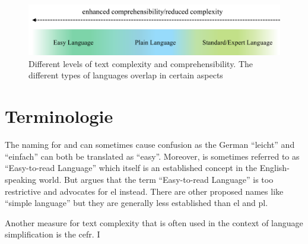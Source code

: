 \begin{figure}
    \centering
    \includegraphics[width=\linewidth]{images/easy_languages}
    \caption[Different levels of text complexity and comprehensibility.]{Different levels of text complexity and comprehensibility. The different types of languages overlap in certain aspects~\autocite{easyLanguageBook}}
    \label{fig:languages}
\end{figure}

\section{Terminologie}\label{sec:term}
The naming for  and  can sometimes cause confusion as the German \enquote{leicht} and \enquote{einfach} can both be translated as \enquote{easy}.
Moreover,  is sometimes referred to as \enquote{Easy-to-read Language} which itself is an established concept in the English-speaking world.
But \textcite{easyLanguageBook} argues that the term \enquote{Easy-to-read Language} is too restrictive and advocates for \gls{el} instead.
There are other proposed names like \enquote{simple language} but they are generally less established than \gls{el} and \gls{pl}.

Another measure for text complexity that is often used in the context of language simplification is the \gls{cefr}.
I~\autocite{cefr_camb}




%


%



